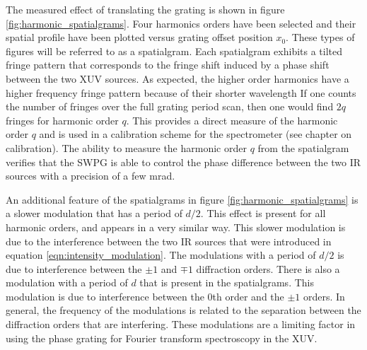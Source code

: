 The measured effect of translating the grating is shown in figure \ref{fig:harmonic_spatialgrams}. Four harmonics orders have been selected and their spatial profile have been plotted versus grating offset position $x_0$.  These types of figures will be referred to as a spatialgram. Each spatialgram exhibits a tilted fringe pattern that corresponds to the fringe shift induced by a phase shift between the two XUV sources.  As expected, the higher order harmonics have a higher frequency fringe pattern because of their shorter wavelength  If one counts the number of fringes over the full grating period scan, then one would find $2q$ fringes for harmonic order $q$. This provides a direct measure of the harmonic order $q$ and is used in a calibration scheme for the spectrometer (see chapter on calibration).  The ability to measure the harmonic order $q$ from the spatialgram verifies that the SWPG is able to control the phase difference between the two IR sources with a precision of a few mrad.

An additional feature of the spatialgrams in figure \ref{fig:harmonic_spatialgrams} is a slower modulation that has a period of $d/2$.  This effect is present for all harmonic orders, and appears in a very similar way.  This slower modulation is due to the interference between the two IR sources that were introduced in equation \ref{eqn:intensity_modulation}.  The modulations with a period of $d/2$ is due to interference between the $\pm1$ and $\mp1$ diffraction orders.  There is also a modulation with a period of $d$ that is present in the spatialgrams.  This modulation is due to interference between the 0th order and the $\pm1$ orders.  In general, the frequency of the modulations is related to the separation between the diffraction orders that are interfering.  These modulations are a limiting factor in using the phase grating for Fourier transform spectroscopy in the XUV.

